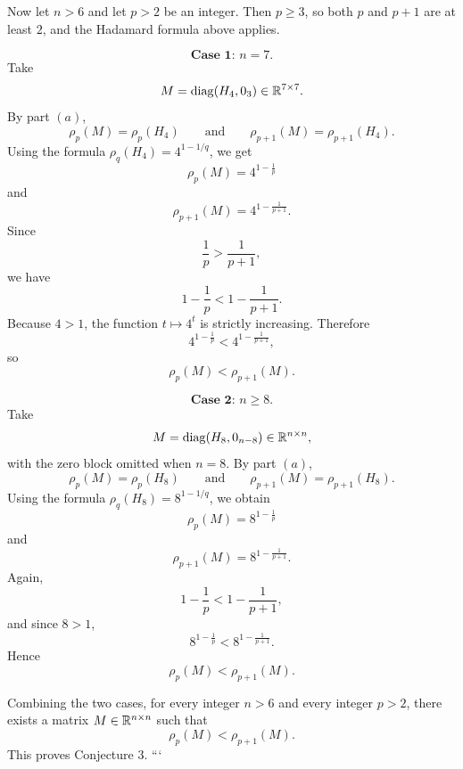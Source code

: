 Now let \(n>6\) and let \(p>2\) be an integer. Then \(p\geq 3\), so both \(p\) and \(p+1\) are at least \(2\), and the Hadamard formula above applies.

\[
\textbf{Case 1: } n=7.
\]
Take
\[
M=\operatorname{diag}(H_4,0_3)\in \mathbb{R}^{7\times 7}.
\]
By part \((a)\),
\[
\rho_p(M)=\rho_p(H_4)
\qquad\text{and}\qquad
\rho_{p+1}(M)=\rho_{p+1}(H_4).
\]
Using the formula \(\rho_q(H_4)=4^{1-1/q}\), we get
\[
\rho_p(M)=4^{1-\frac1p}
\]
and
\[
\rho_{p+1}(M)=4^{1-\frac1{p+1}}.
\]
Since
\[
\frac1p>\frac1{p+1},
\]
we have
\[
1-\frac1p<1-\frac1{p+1}.
\]
Because \(4>1\), the function \(t\mapsto 4^t\) is strictly increasing. Therefore
\[
4^{1-\frac1p}<4^{1-\frac1{p+1}},
\]
so
\[
\rho_p(M)<\rho_{p+1}(M).
\]

\[
\textbf{Case 2: } n\geq 8.
\]
Take
\[
M=\operatorname{diag}(H_8,0_{n-8})\in \mathbb{R}^{n\times n},
\]
with the zero block omitted when \(n=8\). By part \((a)\),
\[
\rho_p(M)=\rho_p(H_8)
\qquad\text{and}\qquad
\rho_{p+1}(M)=\rho_{p+1}(H_8).
\]
Using the formula \(\rho_q(H_8)=8^{1-1/q}\), we obtain
\[
\rho_p(M)=8^{1-\frac1p}
\]
and
\[
\rho_{p+1}(M)=8^{1-\frac1{p+1}}.
\]
Again,
\[
1-\frac1p<1-\frac1{p+1},
\]
and since \(8>1\),
\[
8^{1-\frac1p}<8^{1-\frac1{p+1}}.
\]
Hence
\[
\rho_p(M)<\rho_{p+1}(M).
\]

Combining the two cases, for every integer \(n>6\) and every integer \(p>2\), there exists a matrix \(M\in \mathbb{R}^{n\times n}\) such that
\[
\boxed{\rho_p(M)<\rho_{p+1}(M)}.
\]
This proves Conjecture \(3\).
```